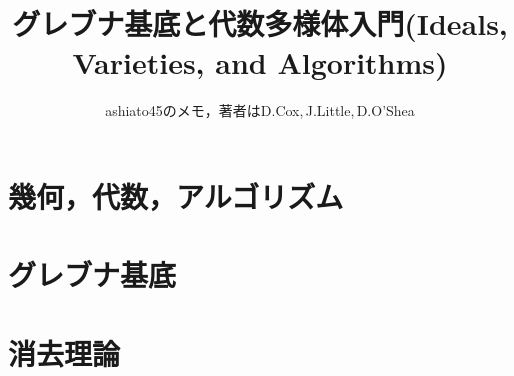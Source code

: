 \documentclass[9pt]{ltjsarticle}
\title{グレブナ基底と代数多様体入門(Ideals, Varieties, and Algorithms)}
\author{ashiato45のメモ，著者はD.Cox,\,J.Little,\,D.O'Shea}
\begin{document}
\maketitle


\section{幾何，代数，アルゴリズム}

%


\section{グレブナ基底}
%


\section{消去理論}
\label{sec:消去理論}
\end{document}
